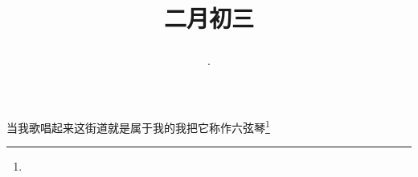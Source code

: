 \title{\date[d=12,m=3,y=2024][year:cn-y,年,month:cn,day:cn,日,·,weekday]·二月初三 }
当我歌唱起来这街道就是属于我的我把它称作六弦琴\footnote{ }

